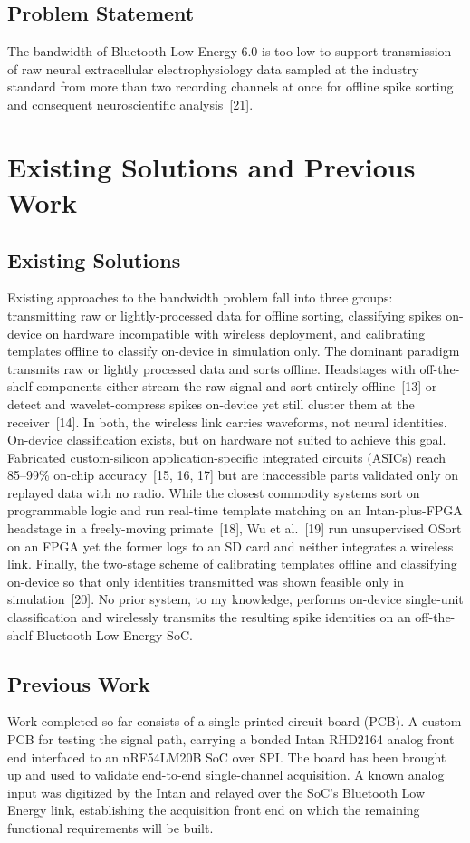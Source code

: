 \documentclass[11pt]{article}
\begin{document}
\subsection{Problem Statement}
The bandwidth of Bluetooth Low Energy 6.0 is too low to support transmission of raw neural
extracellular electrophysiology data sampled at the industry standard from more than two
recording channels at once for offline spike sorting and consequent neuroscientific
analysis~[21].

\section{Existing Solutions and Previous Work}

\subsection{Existing Solutions}
Existing approaches to the bandwidth problem fall into three groups: transmitting raw or
lightly-processed data for offline sorting, classifying spikes on-device on hardware
incompatible with wireless deployment, and calibrating templates offline to classify on-device in
simulation only. The dominant paradigm transmits raw or lightly processed data and sorts
offline. Headstages with off-the-shelf components either stream the raw signal and sort
entirely offline~[13] or detect and wavelet-compress spikes on-device yet still cluster
them at the receiver~[14]. In both, the wireless link carries waveforms, not neural
identities. On-device classification exists, but on hardware not suited to achieve this
goal. Fabricated custom-silicon application-specific integrated circuits (ASICs) reach
85--99\% on-chip accuracy~[15, 16, 17] but are inaccessible parts validated only on
replayed data with no radio. While the closest commodity systems sort on programmable logic
and run real-time template matching on an Intan-plus-FPGA headstage in a freely-moving
primate~[18], Wu et al.~[19] run unsupervised OSort on an FPGA yet the former logs to an SD
card and neither integrates a wireless link. Finally, the two-stage scheme of calibrating
templates offline and classifying on-device so that only identities transmitted was
shown feasible only in simulation~[20]. No prior system, to my knowledge, performs
on-device single-unit classification and wirelessly transmits the resulting spike
identities on an off-the-shelf Bluetooth Low Energy SoC.

\subsection{Previous Work}
Work completed so far consists of a single printed circuit board (PCB). A custom PCB
for testing the signal path, carrying a bonded Intan RHD2164 analog front end
interfaced to an nRF54LM20B SoC over SPI. The board has been brought up and used to
validate end-to-end single-channel acquisition. A known analog input was digitized by the Intan
and relayed over the SoC's Bluetooth Low Energy link, establishing the acquisition front end
on which the remaining functional requirements will be built.
\end{document}
